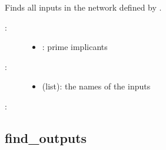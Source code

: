 \documentclass[letterpaper,10pt,english]{sphinxmanual}
\begin{document}
\begin{fulllineitems}
\label{\detokenize{PrimeImplicants:PyBoolNet.PrimeImplicants.find_inputs}}
Finds all inputs in the network defined by .
\begin{description}
\item[{:}] \leavevmode\begin{itemize}
\item {} 
: prime implicants

\end{itemize}

\item[{:}] \leavevmode\begin{itemize}
\item {} 
 (list): the names of the inputs

\end{itemize}

\end{description}

:

\begin{sphinxVerbatim}[commandchars=\\\{\}]
\end{sphinxVerbatim}

\end{fulllineitems}



\subsection{find\_outputs}
\label{\detokenize{PrimeImplicants:id4}}\label{\detokenize{PrimeImplicants:find-outputs}}
\end{document}
